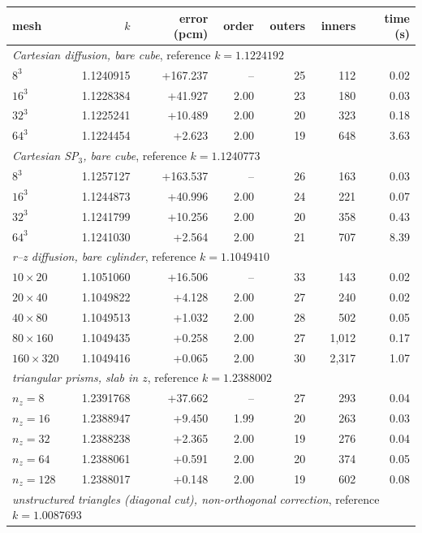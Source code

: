 \begin{tabular}{lrrrrrr}
\hline
mesh & $k$ & error (pcm) & order & outers & inners & time (s)\\
\hline
\multicolumn{7}{l}{\textit{Cartesian diffusion, bare cube}, reference $k = 1.1224192$}\\
$8^3$ & 1.1240915 & +167.237 & -- & 25 & 112 & 0.02\\
$16^3$ & 1.1228384 & +41.927 & 2.00 & 23 & 180 & 0.03\\
$32^3$ & 1.1225241 & +10.489 & 2.00 & 20 & 323 & 0.18\\
$64^3$ & 1.1224454 & +2.623 & 2.00 & 19 & 648 & 3.63\\
\multicolumn{7}{l}{\textit{Cartesian SP$_3$, bare cube}, reference $k = 1.1240773$}\\
$8^3$ & 1.1257127 & +163.537 & -- & 26 & 163 & 0.03\\
$16^3$ & 1.1244873 & +40.996 & 2.00 & 24 & 221 & 0.07\\
$32^3$ & 1.1241799 & +10.256 & 2.00 & 20 & 358 & 0.43\\
$64^3$ & 1.1241030 & +2.564 & 2.00 & 21 & 707 & 8.39\\
\multicolumn{7}{l}{\textit{r--z diffusion, bare cylinder}, reference $k = 1.1049410$}\\
$10\times20$ & 1.1051060 & +16.506 & -- & 33 & 143 & 0.02\\
$20\times40$ & 1.1049822 & +4.128 & 2.00 & 27 & 240 & 0.02\\
$40\times80$ & 1.1049513 & +1.032 & 2.00 & 28 & 502 & 0.05\\
$80\times160$ & 1.1049435 & +0.258 & 2.00 & 27 & 1,012 & 0.17\\
$160\times320$ & 1.1049416 & +0.065 & 2.00 & 30 & 2,317 & 1.07\\
\multicolumn{7}{l}{\textit{triangular prisms, slab in $z$}, reference $k = 1.2388002$}\\
$n_z = 8$ & 1.2391768 & +37.662 & -- & 27 & 293 & 0.04\\
$n_z = 16$ & 1.2388947 & +9.450 & 1.99 & 20 & 263 & 0.03\\
$n_z = 32$ & 1.2388238 & +2.365 & 2.00 & 19 & 276 & 0.04\\
$n_z = 64$ & 1.2388061 & +0.591 & 2.00 & 20 & 374 & 0.05\\
$n_z = 128$ & 1.2388017 & +0.148 & 2.00 & 19 & 602 & 0.08\\
\multicolumn{7}{l}{\textit{unstructured triangles (diagonal cut), non-orthogonal correction}, reference $k = 1.0087693$}\\

\end{tabular}
